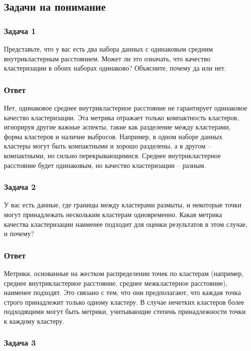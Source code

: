 \subsection{Задачи на понимание}
\subsubsection{Задача 1}

Представьте, что у вас есть два набора данных с одинаковым средним внутрикластерным расстоянием. Может ли это означать, что качество кластеризации в обоих наборах одинаково? Объясните, почему да или нет.

\subsubsection{Ответ}

Нет, одинаковое среднее внутрикластерное расстояние не гарантирует одинаковое качество кластеризации. Эта метрика отражает только компактность кластеров, игнорируя другие важные аспекты, такие как разделение между кластерами, форма кластеров и наличие выбросов. Например, в одном наборе данных кластеры могут быть компактными и хорошо разделены, а в другом -- компактными, но сильно перекрывающимися. Среднее внутрикластерное расстояние будет одинаковым, но качество кластеризации -- разным.

\subsubsection{Задача 2}

У вас есть данные, где границы между кластерами размыты, и некоторые точки могут принадлежать нескольким кластерам одновременно. Какая метрика качества кластеризации наименее подходит для оценки результатов в этом случае, и почему?

\subsubsection{Ответ}

Метрики, основанные на жестком распределении точек по кластерам (например, среднее внутрикластерное расстояние, среднее межкластерное расстояние), наименее подходят. Это связано с тем, что они предполагают, что каждая точка строго принадлежит только одному кластеру. В случае нечетких кластеров более подходящими могут быть метрики, учитывающие степень принадлежности точки к каждому кластеру.

\subsubsection{Задача 3}

